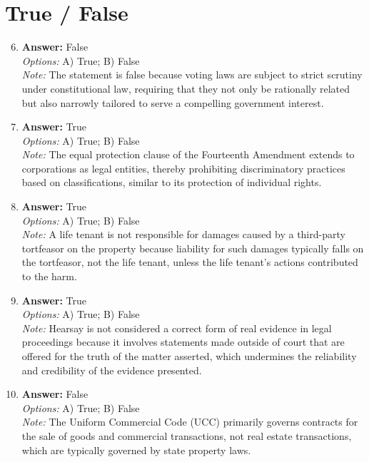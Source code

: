 \documentclass[12pt]{article}
\begin{document}
\section*{True / False}
\begin{enumerate}[label=\arabic*.]
\setcounter{enumi}{5}
\item \textbf{Answer:} False
\\ \textit{Options:} A) True; B) False
\\ \textit{Note:} The statement is false because voting laws are subject to strict scrutiny under constitutional law, requiring that they not only be rationally related but also narrowly tailored to serve a compelling government interest.
\item \textbf{Answer:} True
\\ \textit{Options:} A) True; B) False
\\ \textit{Note:} The equal protection clause of the Fourteenth Amendment extends to corporations as legal entities, thereby prohibiting discriminatory practices based on classifications, similar to its protection of individual rights.
\item \textbf{Answer:} True
\\ \textit{Options:} A) True; B) False
\\ \textit{Note:} A life tenant is not responsible for damages caused by a third-party tortfeasor on the property because liability for such damages typically falls on the tortfeasor, not the life tenant, unless the life tenant's actions contributed to the harm.
\item \textbf{Answer:} True
\\ \textit{Options:} A) True; B) False
\\ \textit{Note:} Hearsay is not considered a correct form of real evidence in legal proceedings because it involves statements made outside of court that are offered for the truth of the matter asserted, which undermines the reliability and credibility of the evidence presented.
\item \textbf{Answer:} False
\\ \textit{Options:} A) True; B) False
\\ \textit{Note:} The Uniform Commercial Code (UCC) primarily governs contracts for the sale of goods and commercial transactions, not real estate transactions, which are typically governed by state property laws.
\end{enumerate}
\end{document}
